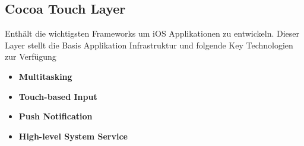 \subsection{Cocoa Touch Layer}
\label{sec:CocoaTouchLayer}
Enthält die wichtigsten Frameworks um iOS Applikationen zu entwickeln. Dieser
Layer stellt die Basis Applikation Infrastruktur und folgende Key Technologien zur Verfügung

	\begin{itemize}
		\item \textbf{Multitasking}
		\item \textbf{Touch-based Input}
		\item \textbf{Push Notification}
		\item \textbf{High-level System Service}	
	\end{itemize}

